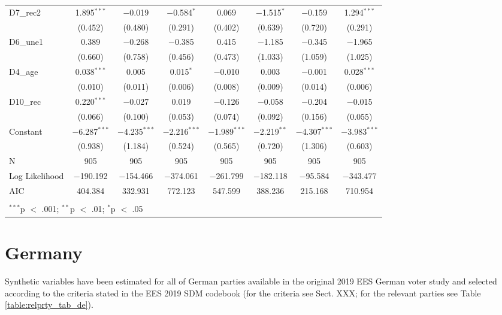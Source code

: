 \documentclass[
]{article}
\begin{document}
\begin{table}[!htbp]
\begin{tabular}{@{\extracolsep{5pt}}lccccccc}
  D7\_rec2 & 1.895$^{***}$ & $-$0.019 & $-$0.584$^{*}$ & 0.069 & $-$1.515$^{*}$ & $-$0.159 & 1.294$^{***}$ \\ 
  & (0.452) & (0.480) & (0.291) & (0.402) & (0.639) & (0.720) & (0.291) \\ 
  D6\_une1 & 0.389 & $-$0.268 & $-$0.385 & 0.415 & $-$1.185 & $-$0.345 & $-$1.965 \\ 
  & (0.660) & (0.758) & (0.456) & (0.473) & (1.033) & (1.059) & (1.025) \\ 
  D4\_age & 0.038$^{***}$ & 0.005 & 0.015$^{*}$ & $-$0.010 & 0.003 & $-$0.001 & 0.028$^{***}$ \\ 
  & (0.010) & (0.011) & (0.006) & (0.008) & (0.009) & (0.014) & (0.006) \\ 
  D10\_rec & 0.220$^{***}$ & $-$0.027 & 0.019 & $-$0.126 & $-$0.058 & $-$0.204 & $-$0.015 \\ 
  & (0.066) & (0.100) & (0.053) & (0.074) & (0.092) & (0.156) & (0.055) \\ 
  Constant & $-$6.287$^{***}$ & $-$4.235$^{***}$ & $-$2.216$^{***}$ & $-$1.989$^{***}$ & $-$2.219$^{**}$ & $-$4.307$^{***}$ & $-$3.983$^{***}$ \\ 
  & (0.938) & (1.184) & (0.524) & (0.565) & (0.720) & (1.306) & (0.603) \\ 
 N & 905 & 905 & 905 & 905 & 905 & 905 & 905 \\ 
Log Likelihood & $-$190.192 & $-$154.466 & $-$374.061 & $-$261.799 & $-$182.118 & $-$95.584 & $-$343.477 \\ 
AIC & 404.384 & 332.931 & 772.123 & 547.599 & 388.236 & 215.168 & 710.954 \\ 
\hline \\[-1.8ex] 
\multicolumn{8}{l}{$^{***}$p $<$ .001; $^{**}$p $<$ .01; $^{*}$p $<$ .05} \\ 
\end{tabular} 
\end{table}

\clearpage

\newpage

\hypertarget{germany}{%
\section{Germany}\label{germany}}

Synthetic variables have been estimated for all of German parties available in the original
2019 EES German voter study and selected according to the criteria stated in the EES 2019 SDM codebook (for the criteria see Sect. XXX; for the relevant parties see Table \ref{table:relprty_tab_de}).
\end{document}
